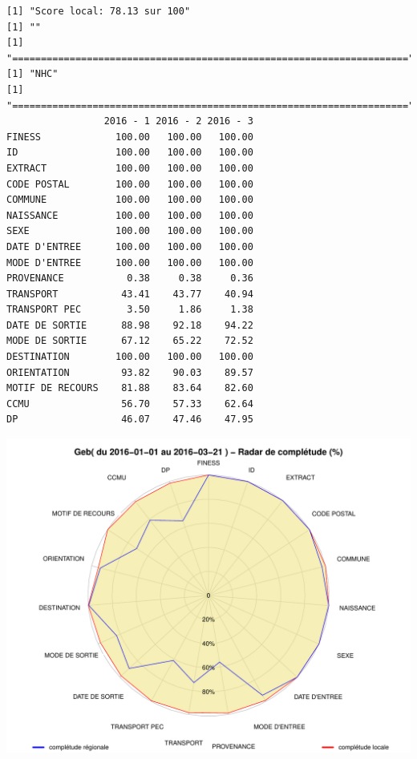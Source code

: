 \documentclass[]{article}
\begin{document}
\begin{verbatim}
[1] "Score local: 78.13 sur 100"
[1] ""
[1] "====================================================================="
[1] "NHC"
[1] "====================================================================="
                 2016 - 1 2016 - 2 2016 - 3
FINESS             100.00   100.00   100.00
ID                 100.00   100.00   100.00
EXTRACT            100.00   100.00   100.00
CODE POSTAL        100.00   100.00   100.00
COMMUNE            100.00   100.00   100.00
NAISSANCE          100.00   100.00   100.00
SEXE               100.00   100.00   100.00
DATE D'ENTREE      100.00   100.00   100.00
MODE D'ENTREE      100.00   100.00   100.00
PROVENANCE           0.38     0.38     0.36
TRANSPORT           43.41    43.77    40.94
TRANSPORT PEC        3.50     1.86     1.38
DATE DE SORTIE      88.98    92.18    94.22
MODE DE SORTIE      67.12    65.22    72.52
DESTINATION        100.00   100.00   100.00
ORIENTATION         93.82    90.03    89.57
MOTIF DE RECOURS    81.88    83.64    82.60
CCMU                56.70    57.33    62.64
DP                  46.07    47.46    47.95
\end{verbatim}

\includegraphics{completude_files/figure-latex/finess-5.pdf}
\end{document}
